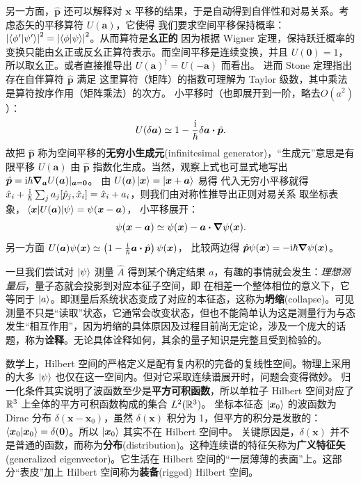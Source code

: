 另一方面，$\hat{\bm p}$ 还可以解释对 $\bm x$ 平移的结果，于是自动得到自伴性和对易关系。考虑态矢的平移算符 $U(\bm a)$，它使得
我们要求空间平移保持概率：$\abs{\ip{\phi'}{\psi'}}^2=\abs{\ip{\phi}{\psi}}^2$。从而算符是\textbf{幺正的}
因为根据 Wigner 定理，保持跃迁概率的变换只能由幺正或反幺正算符表示。而空间平移是连续变换，并且 $U(\bm 0)=1$，所以取幺正。或者直接推导出 $U(\bm a)^\dagger=U(-\bm a)$ 而看出。
进而 Stone 定理指出存在自伴算符 $\hat{\bm p}$ 满足
这里算符（矩阵）的指数可理解为 Taylor 级数，其中乘法是算符按序作用（矩阵乘法）的次方。
小平移时（也即展开到一阶，略去$O(a^2)$）：
\[
U(\delta \bm a)
\simeq
1-\frac{\i}{\hbar}\delta\bm a\vdot \hat{\bm p}.
\]
故把 $\hat{\bm p}$ 称为空间平移的\textbf{无穷小生成元}(infinitesimal generator)，“生成元”意思是有限平移 $U(\bm a)$ 由 $\hat{\bm p}$ 指数化生成。当然，观察上式也可显式地写出 $\hat{\bm p}=\mathrm{i}\hbar\grad_{\bm a}U(\bm a)|_{\bm a=\bm 0}$。
由 $U(\bm a)\ket{\bm x} = \ket{\bm x+\bm a}$ 易得
代入无穷小平移就得 $\hat{x}_i+\frac{\mathrm{i}}{\hbar} \sum_j a_j[\hat p_j,\hat x_i]=\hat{x}_i+a_i$，则我们由对称性推导出正则对易关系
取坐标表象，$\mel{\bm x}{U(\bm a)}{\psi}=\psi(\bm x-\bm a)$，
小平移展开：
\[
\psi(\bm x-\bm a)
\simeq
\psi(\bm x)-\bm a\vdot \grad\psi(\bm x).
\]
另一方面 $U(\bm a)\psi(\bm x)
\simeq
\left(1-\frac{\i}{\hbar}\bm a\vdot \hat{\bm p}\right)\psi(\bm x)$，
比较两边得 $\hat{\bm p}\psi(\bm x)=-\mathrm{i}\hbar\grad\psi(\bm x)$。

一旦我们尝试对 $\ket\psi$ 测量 $\hat A$ 得到某个确定结果 $a$，有趣的事情就会发生：\textit{理想测量后}，量子态就会投影到对应本征子空间，即
在相差一个整体相位的意义下，它等同于 $\ket a$。即测量后系统状态变成了对应的本征态，这称为\textbf{坍缩}(collapse)。可见测量不只是“读取”状态，它通常会改变状态，但也不能简单认为这是测量行为与态发生“相互作用”，因为坍缩的具体原因及过程目前尚无定论，涉及一个庞大的话题，称为\textbf{诠释}。无论具体诠释如何，其余的量子知识是完整且受到检验的。

数学上，Hilbert 空间的严格定义是配有复内积的完备的复线性空间。物理上采用的大多 $\ket{\psi}$ 也仅在这一空间内。但对它采取连续谱展开时，问题会变得微妙。
归一化条件其实说明了波函数至少是\textbf{平方可积函数}，所以单粒子 Hilbert 空间对应了 $\mathbb{R}^3$ 上全体的平方可积函数构成的集合 $L^2(\mathbb{R}^3)$。
坐标本征态 $\ket{\bm x_0}$ 的波函数为 Dirac 分布 $\delta(\bm x-\bm x_0)$，虽然 $\delta(\bm x)$ 积分为 1，但平方的积分是发散的：$\ip{\bm x_0}=\delta(\bm 0)$。所以 $\ket{\bm x_0}$ 其实不在 Hilbert 空间中。
关键原因是，$\delta(\bm x)$ 并不是普通的函数，而称为\textbf{分布}(distribution)。这种连续谱的特征矢称为\textbf{广义特征矢}(generalized eigenvector)。它生活在 Hilbert 空间的“一层薄薄的表面”上。这部分“表皮”加上 Hilbert 空间称为\textbf{装备}(rigged) Hilbert 空间。

